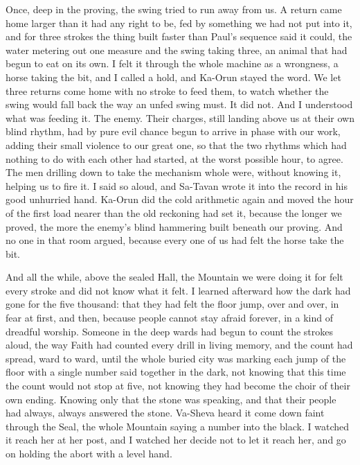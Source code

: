 Once, deep in the proving, the swing tried to run away from us. A return came home larger than it had any right to be, fed by something we had not put into it, and for three strokes the thing built faster than Paul's sequence said it could, the water metering out one measure and the swing taking three, an animal that had begun to eat on its own. I felt it through the whole machine as a wrongness, a horse taking the bit, and I called a hold, and Ka-Orun stayed the word. We let three returns come home with no stroke to feed them, to watch whether the swing would fall back the way an unfed swing must. It did not. And I understood what was feeding it. The enemy. Their charges, still landing above us at their own blind rhythm, had by pure evil chance begun to arrive in phase with our work, adding their small violence to our great one, so that the two rhythms which had nothing to do with each other had started, at the worst possible hour, to agree. The men drilling down to take the mechanism whole were, without knowing it, helping us to fire it. I said so aloud, and Sa-Tavan wrote it into the record in his good unhurried hand. Ka-Orun did the cold arithmetic again and moved the hour of the first load nearer than the old reckoning had set it, because the longer we proved, the more the enemy's blind hammering built beneath our proving. And no one in that room argued, because every one of us had felt the horse take the bit.\par

And all the while, above the sealed Hall, the Mountain we were doing it for felt every stroke and did not know what it felt. I learned afterward how the dark had gone for the five thousand: that they had felt the floor jump, over and over, in fear at first, and then, because people cannot stay afraid forever, in a kind of dreadful worship. Someone in the deep wards had begun to count the strokes aloud, the way Faith had counted every drill in living memory, and the count had spread, ward to ward, until the whole buried city was marking each jump of the floor with a single number said together in the dark, not knowing that this time the count would not stop at five, not knowing they had become the choir of their own ending. Knowing only that the stone was speaking, and that their people had always, always answered the stone. Va-Sheva heard it come down faint through the Seal, the whole Mountain saying a number into the black. I watched it reach her at her post, and I watched her decide not to let it reach her, and go on holding the abort with a level hand.\par

